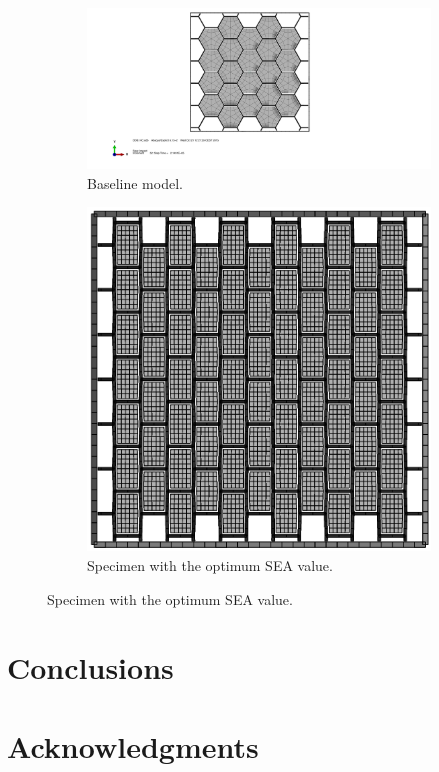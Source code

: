 \documentclass[cmfonts]{witpress}
\begin{document}
\begin{figure}[htpb]
\begin{subfigure}[b]{.45\columnwidth}
   \includegraphics[width=\columnwidth]{figures/IMG/sc1.pdf}
    \caption{Baseline model.}
    \label{fig:back0}
\end{subfigure}
\qquad
\begin{subfigure}[b]{.45\columnwidth}
   \includegraphics[width=\columnwidth]{figures/IMG/topview}
    \caption{Specimen with the optimum SEA value.}
    \label{fig:back5}
\end{subfigure}
\end{figure}




\section{Conclusions}
\section{Acknowledgments}




\end{document}
